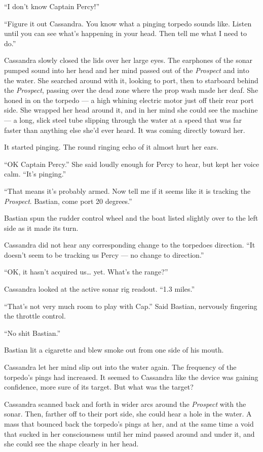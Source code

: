 \documentclass[]{scrbook}
\begin{document}
``I don't know Captain Percy!''

``Figure it out Cassandra. You know what a pinging torpedo sounds like.
Listen until you can see what's happening in your head. Then tell me
what I need to do.''

Cassandra slowly closed the lids over her large eyes. The earphones of
the sonar pumped sound into her head and her mind passed out of the
\emph{Prospect} and into the water. She searched around with it, looking
to port, then to starboard behind the \emph{Prospect}, passing over the
dead zone where the prop wash made her deaf. She honed in on the torpedo
--- a high whining electric motor just off their rear port side. She
wrapped her head around it, and in her mind she could see the machine
--- a long, slick steel tube slipping through the water at a speed that
was far faster than anything else she'd ever heard. It was coming
directly toward her.

It started pinging. The round ringing echo of it almost hurt her ears.

``OK Captain Percy.'' She said loudly enough for Percy to hear, but kept
her voice calm. ``It's pinging.''

``That means it's probably armed. Now tell me if it seems like it is
tracking the \emph{Prospect}. Bastian, come port 20 degrees.''

Bastian spun the rudder control wheel and the boat listed slightly over
to the left side as it made its turn.

Cassandra did not hear any corresponding change to the torpedoes
direction. ``It doesn't seem to be tracking us Percy --- no change to
direction.''

``OK, it hasn't acquired us\ldots{} yet. What's the range?''

Cassandra looked at the active sonar rig readout. ``1.3 miles.''

``That's not very much room to play with Cap.'' Said Bastian, nervously
fingering the throttle control.

``No shit Bastian.''

Bastian lit a cigarette and blew smoke out from one side of his mouth.

Cassandra let her mind slip out into the water again. The frequency of
the torpedo's pings had increased. It seemed to Cassandra like the
device was gaining confidence, more sure of its target. But what was the
target?

Cassandra scanned back and forth in wider arcs around the
\emph{Prospect} with the sonar. Then, farther off to their port side,
she could hear a hole in the water. A mass that bounced back the
torpedo's pings at her, and at the same time a void that sucked in her
consciousness until her mind passed around and under it, and she could
see the shape clearly in her head.
\end{document}
